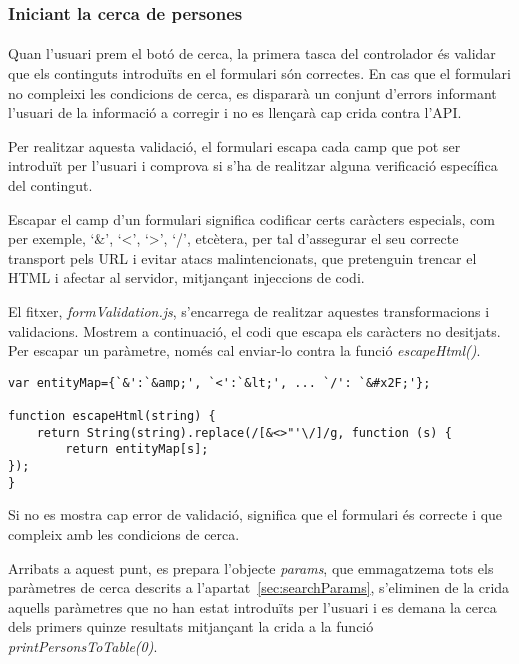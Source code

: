 \subsubsection{Iniciant la cerca de persones}

\paragraph{}
Quan l'usuari prem el botó de cerca, la primera tasca del controlador és validar que els continguts introduïts en el formulari són correctes. En cas que el formulari no compleixi les condicions de cerca, es dispararà un conjunt d'errors informant l'usuari de la informació a corregir i no es llençarà cap crida contra l'API.

Per realitzar aquesta validació, el formulari escapa cada camp que pot ser introduït per l'usuari i comprova si s'ha de realitzar alguna verificació específica del contingut.

Escapar el camp d'un formulari significa codificar certs caràcters especials, com per exemple, `\&', `<', `>', `/', etcètera, per tal d'assegurar el seu correcte transport pels URL i evitar atacs malintencionats, que pretenguin trencar el HTML i afectar al servidor, mitjançant injeccions de codi.

El fitxer, \emph{formValidation.js}, s'encarrega de realitzar aquestes transformacions i validacions. Mostrem a continuació, el codi que escapa els caràcters no desitjats. Per escapar un paràmetre, només cal enviar-lo contra la funció \emph{escapeHtml()}.

\begin{lstlisting}[style=rawOwn,caption={Funcio \emph{escapeHtml()} i la variable \emph{entityMap}}]
var entityMap={`&':`&amp;', `<':`&lt;', ... `/': `&#x2F;'};

function escapeHtml(string) {
    return String(string).replace(/[&<>"'\/]/g, function (s) {
        return entityMap[s];
});
}
\end{lstlisting}

Si no es mostra cap error de validació, significa que el formulari és correcte i que compleix amb les condicions de cerca.

Arribats a aquest punt, es prepara l'objecte \emph{params}, que emmagatzema tots els paràmetres de cerca descrits a l'apartat~\ref{sec:searchParams}, s'eliminen de la crida aquells pa\-rà\-me\-tres que no han estat introduïts per l'usuari i es demana la cerca dels primers quinze resultats mitjançant la crida a la funció \emph{print\-Persons\-To\-Table(0)}.
